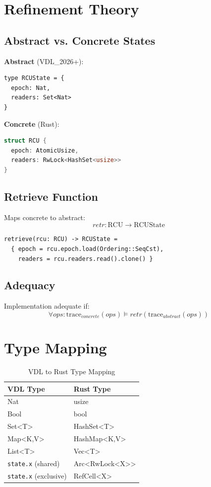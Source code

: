\documentclass[conference]{IEEEtran}
\begin{document}
\section{Refinement Theory}

\subsection{Abstract vs. Concrete States}

\textbf{Abstract} (VDL\_2026+):
\begin{lstlisting}
type RCUState = {
  epoch: Nat,
  readers: Set<Nat>
}
\end{lstlisting}

\textbf{Concrete} (Rust):
\begin{lstlisting}[language=Rust]
struct RCU {
  epoch: AtomicUsize,
  readers: RwLock<HashSet<usize>>
}
\end{lstlisting}

\subsection{Retrieve Function}

Maps concrete to abstract:
\begin{equation}
retr: \text{RCU} \to \text{RCUState}
\end{equation}

\begin{lstlisting}
retrieve(rcu: RCU) -> RCUState =
  { epoch = rcu.epoch.load(Ordering::SeqCst),
    readers = rcu.readers.read().clone() }
\end{lstlisting}

\subsection{Adequacy}

Implementation adequate if:
\begin{equation}
\forall ops: \text{trace}_{concrete}(ops) \models retr(\text{trace}_{abstract}(ops))
\end{equation}

\section{Type Mapping}

\begin{table}[h]
\centering
\caption{VDL to Rust Type Mapping}
\begin{tabular}{ll}
\toprule
\textbf{VDL Type} & \textbf{Rust Type} \\
\midrule
Nat & usize \\
Bool & bool \\
Set<T> & HashSet<T> \\
Map<K,V> & HashMap<K,V> \\
List<T> & Vec<T> \\
\texttt{state.x} (shared) & Arc<RwLock<X>> \\
\texttt{state.x} (exclusive) & RefCell<X> \\
\bottomrule
\end{tabular}
\end{table}
\end{document}
